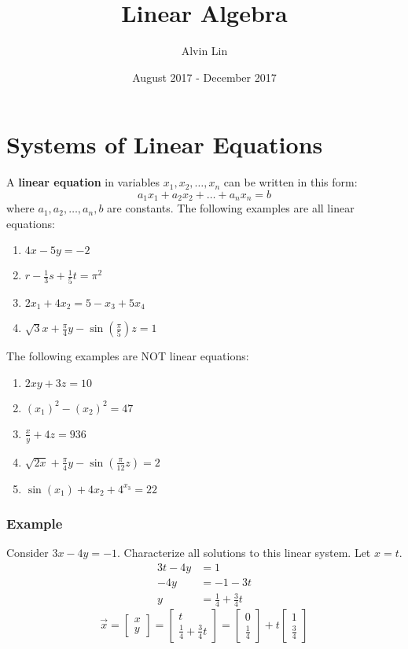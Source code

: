 \documentclass{math}
\title{Linear Algebra}
\author{Alvin Lin}
\date{August 2017 - December 2017}
\begin{document}
\maketitle

\section*{Systems of Linear Equations}
A \textbf{linear equation} in variables \( x_1,x_2,\dots,x_n \) can be written
in this form:
\[ a_1x_1+a_2x_2+\dots+a_nx_n = b \]
where \( a_1,a_2,\dots,a_n,b \) are constants. The following examples are all
linear equations:
\begin{enumerate}
  \item \( 4x-5y = -2 \)
  \item \( r-\frac{1}{3}s+\frac{1}{5}t = \pi^2 \)
  \item \( 2x_1+4x_2 = 5-x_3+5x_4 \)
  \item \( \sqrt{3}x+\frac{\pi}{4}y-\sin(\frac{\pi}{5})z = 1 \)
\end{enumerate}
The following examples are NOT linear equations:
\begin{enumerate}
  \item \( 2xy+3z = 10 \)
  \item \( (x_1)^2-(x_2)^2 = 47 \)
  \item \( \frac{x}{y}+4z = 936 \)
  \item \( \sqrt{2x}+\frac{\pi}{4}y-\sin(\frac{\pi}{12}z) = 2 \)
  \item \( \sin(x_1)+4x_2+4^{x_3} = 22 \)
\end{enumerate}

\subsubsection*{Example}
Consider \( 3x-4y = -1 \). Characterize all solutions to this linear system.
Let \( x = t \).
\begin{align*}
  3t-4y &= 1 \\
  -4y &= -1-3t \\
  y &= \frac{1}{4}+\frac{3}{4}t
\end{align*}
\[ \vec{x} = \begin{bmatrix}x \\ y\end{bmatrix} =
  \begin{bmatrix}t \\ \frac{1}{4}+\frac{3}{4}t\end{bmatrix} =
  \begin{bmatrix}0 \\ \frac{1}{4}\end{bmatrix}+
  t\begin{bmatrix}1 \\ \frac{3}{4}\end{bmatrix} \]
\end{document}
